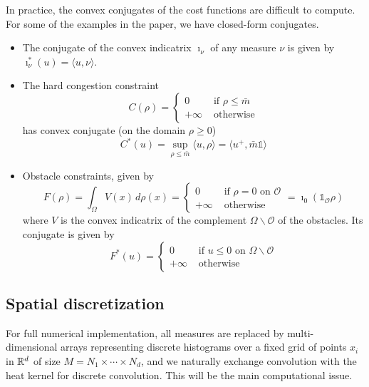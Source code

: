 \documentclass[../report.tex]{subfiles}
\begin{document}
\begin{remark}\label{rem:ConvexConj}
	In practice, the convex conjugates of the cost functions are difficult to compute. For some of the examples in the paper, we have closed-form conjugates.
	\begin{itemize}
		\item The conjugate of the convex indicatrix $\imath_{\nu}$ of any measure $\nu$ is given by $\imath_{\nu}^*(u) = \langle u, \nu\rangle$.
		\item The hard congestion constraint
		\[
		C(\rho) = \begin{cases}
		0&\text{ if }\rho\leq \bar{m} \\
		+\infty&\text{ otherwise}
		\end{cases}
		\]
		has convex conjugate (on the domain $\rho \geq 0$)
		\[
		C^*(u) = \sup_{\rho\leq \bar{m}}{} \langle u, \rho\rangle = \langle u^{+}, \bar{m}\mathds{1}\rangle
		\]
		\item Obstacle constraints, given by
		\[
		F(\rho) = \int_\Omega V(x)\,d\rho(x) =
		\begin{cases}
		0 & \text{ if } \rho = 0\text{ on }\mathscr{O} \\
		+\infty & \text{ otherwise}
		\end{cases}
		= \imath_{0}(\mathds{1}_{\mathscr{O}}\rho)
		\]
		where $V$ is the convex indicatrix of the complement $\Omega\backslash\mathscr{O}$ of the obstacles. Its conjugate is given by
		\[
		F^*(u) =
		\begin{cases}
		0& \text{ if } u \leq 0\text{ on } \Omega\backslash\mathscr{O} \\
		+\infty& \text{ otherwise}
		\end{cases}
		\]
	\end{itemize}
\end{remark}



\subsection{Spatial discretization}\label{sec:PartialDiscret}

For full numerical implementation, all measures are replaced by multi-dimensional arrays representing discrete histograms over a fixed grid of points $x_i$ in $\mathbb{R}^d$ of size $M = N_1\times\cdots\times N_d$, and we naturally exchange convolution with the heat kernel for discrete convolution.  This will be the main computational issue.
\end{document}
